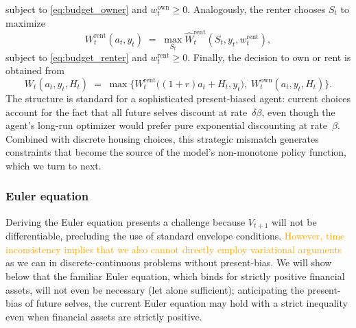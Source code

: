 \documentclass[12pt]{article}
\begin{document}
subject to \eqref{eq:budget_owner} and $w_{t}^{\text{own}}\ge 0$. Analogously, the renter chooses $S_{t}$ to maximize
%
\begin{equation}\label{eq:Bellman_renter}
W_{t}^{\text{rent}}(a_{t},y_{t})
  \;=\;
  \max_{S_{t}}
    \hat{W}_{t}^{\text{rent}}(S_{t},y_{t},w_{t}^{\text{rent}}),
\end{equation}
%
subject to \eqref{eq:budget_renter} and $w_{t}^{\text{rent}}\ge 0$. Finally, the decision to own or rent is obtained from
%
\begin{equation}
W_{t}(a_{t},y_{t},H_{t})
  \;=\;
  \max\bigl\{
    W_{t}^{\text{rent}}\bigl((1+r)a_{t}+H_{t},y_{t}\bigr),
    \;W_{t}^{\text{own}}(a_{t},y_{t},H_{t})
  \bigr\}.
\end{equation}
%
The structure is standard for a sophisticated present-biased agent:
current choices account for the fact that all future selves discount at
rate~$\delta\beta$, even though the agent's long-run optimizer would
prefer pure exponential discounting at rate~$\beta$.  Combined with discrete housing choices, this strategic
mismatch generates constraints that become the source of the model's non-monotone policy function, which we turn to next. 


\subsubsection{Euler equation}

Deriving the Euler equation presents a challenge because $V_{t+1}$ will not be differentiable, precluding the use of standard envelope conditions. \textcolor{orange}{However, time inconsistency implies that we also cannot directly employ variational arguments \citep{Stachurski2009,DS2024RFC}} as we can in discrete-continuous problems without present-bias. We will show below that the familiar Euler equation, which binds for strictly positive financial assets, will not even be necessary (let alone sufficient); anticipating the present-bias of future selves, the current Euler equation may hold with a strict inequality even when financial assets are strictly positive. 
\end{document}
